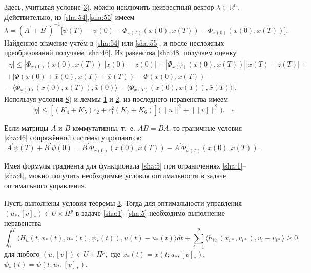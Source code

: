 \begin{mproof}
\smallskip

Здесь, учитывая условие \hyperlink{sha:3)}{3}), можно исключить неизвестный вектор \mbox{$\lambda \in \mathbb R^{n} $}. Действительно, из \eqref{sha:54},\eqref{sha:55} имеем
\begin{equation} \label{sha:56} 
\lambda=(A^{\prime}+B^{\prime})^{-1}\bigl[\psi(T)-\psi(0)-\Phi_{x(T)}(x(0),x(T))-\Phi_{x(0)}(x(0),x(T))\bigr].
\end{equation} 
Найденное значение учтём в \eqref{sha:54} или \eqref{sha:55}, и после несложных преобразований  получаем \eqref{sha:46}. Из равенства \eqref{sha:48} получаем оценку
\begin{multline} \label{sha:57} 
|\eta|\le|\Phi_{x(0)}(x(0),x(T))| |\bar{x}(0)-z(0)|+|\Phi_{x(T)}(x(0),x(T))| |\bar{x}(T)-z(T)|+ 
\\
+|\Phi(x(0)+\bar{x}(0),x(T)+\bar{x}(T))-\Phi(x(0),x(T))-  
\\
-\langle\Phi_{x(0)}(x(0),x(T)),\bar{x}(0)\rangle-\langle\Phi_{x(T)}(x(0),x(T)),\bar{x}(T)\rangle |.
\end{multline} 
Используя условия \hyperlink{sha:8)}{8}) и леммы \hyperlink{sha:lemma:1)}{1} и \hyperlink{sha:lemma:2)}{2}, из последнего неравенства имеем
\begin{equation} \label{sha:58} 
|\eta|\le[(K_{4}+K_{5})c_{2}+c_{1}^{2}(K_{7}+K_{6})]\bigl(\|\bar{u}\|^{2}+\|[\bar{v}]\|^{2}\bigr).  \quad \square
\end{equation} 
\end{mproof}


\begin{remark}[3] Если матрицы $A$ и $B$ коммутативны, т.~е. $AB=BA$, то граничные условия \eqref{sha:46} сопряжённой системы упрощаются:
$$A^{\prime}\psi(T)+B^{\prime}\psi(0)=B^{\prime}\Phi_{x(0)} (x(0), x(T))-A^{\prime}\Phi_{x(T)}(x(0), x(T)).$$
\end{remark}

\smallskip

Имея формулы градиента для функционала \eqref{sha:5} при ограничениях \eqref{sha:1}--\eqref{sha:4}, можно получить необходимые условия оптимальности в задаче оптимального управления.

\smallskip

\hypertarget{sha:th:4)}{}
\begin{theorem}[4]Пусть выполнены условия теоремы {\rm \hyperlink{sha:th:3)}{3}.} 
Тогда для оптимальности управления $(u_{*}, [v]_{*})\in U\times \Pi ^{p} $ в задаче \eqref{sha:1}--\eqref{sha:5} необходимо выполнение неравенства
\begin{equation} \label{sha:59} 
\int_{0}^{T}\bigl\langle H_{u}(t,x_{*}(t),u_{*}(t),\psi_{*}(t)),u(t)-u_{*}(t)\bigr\rangle  dt+\sum_{i=1}^{p}\bigl\langle h_{iv_{i}}(x_{i*},v_{i*}),v_{i}-v_{i*}\bigr\rangle \ge 0  
\end{equation} 
для любого $(u,[v])\in U\times \Pi ^{p},$ где $x_{*}(t)=x(t;u_{*},[v]_{*}),$ $\psi_{*}(t)=\psi(t;u_{*},[v]_{*}).$
\end{theorem}

